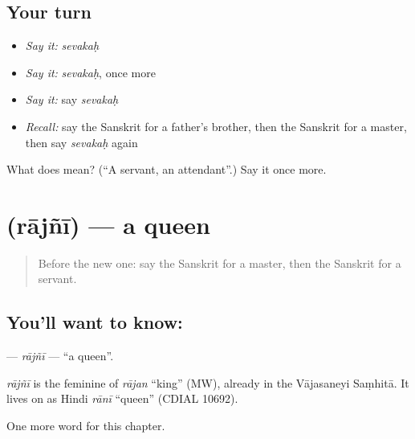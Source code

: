 \subsection*{Your turn}
\begin{itemize}
\raggedright
  \item \emph{Say it:} \emph{sevakaḥ}
  \item \emph{Say it:} \emph{sevakaḥ}, once more
  \item \emph{Say it:} say \emph{sevakaḥ}
  \item \emph{Recall:} say the Sanskrit for a father's brother, then the Sanskrit for a master, then say \emph{sevakaḥ} again
\end{itemize}

\begin{tcolorbox}[breakable,colback=teal!4,colframe=teal!35!black,title={Before you move on}]
What does  mean? (\textquotedblleft{}A servant, an attendant\textquotedblright{}.) Say it once more.
\end{tcolorbox}
\section[\texorpdfstring{\sk{राज्ञी} (rājñī)}{राज्ञी (rājñī)}]{ (rājñī) — a queen}

\label{lesson:SA-C147-rajni}



\begin{quote}
Before the new one: say the Sanskrit for a master, then the Sanskrit for a servant.
\end{quote}

\subsection*{You'll want to know: }
\textbf{} — \emph{rājñī} — \textquotedblleft{}a queen\textquotedblright{}.

\begin{cousinweb}
\emph{rājñī} is the feminine of \emph{rājan} \textquotedblleft{}king\textquotedblright{} (MW), already in the Vājasaneyi Saṃhitā. It lives on as Hindi \emph{rānī} \textquotedblleft{}queen\textquotedblright{} (CDIAL 10692).
\end{cousinweb}

\begin{grammarlens}[title={What you've built}]
One more word for this chapter.
\end{grammarlens}

